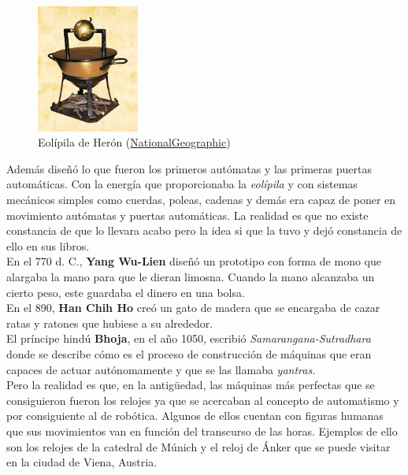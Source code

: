 \begin{figure}[H]
\begin{center}
  \includegraphics[width=0.3\textwidth]{./EtapaPrimeriza/imagenes/mv.jpg}
  \caption{Eolípila de Herón (\href{https://www.nationalgeographic.com.es/historia/grandes-reportajes/inventos-griegos\_9395}{NationalGeographic})}
  \label{mv}
\end{center}
\end{figure}

Además diseñó lo que fueron los primeros autómatas y las primeras puertas automáticas. Con la energía que proporcionaba la \textit{eolípila} y con sistemas mecánicos simples como cuerdas, poleas, cadenas y demás era capaz de poner en movimiento autómatas y puertas automáticas. La realidad es que no existe constancia de que lo llevara acabo pero la idea si que la tuvo y dejó constancia de ello en sus libros.\\


En el 770 d. C., \textbf{Yang Wu-Lien } diseñó un prototipo con forma de mono que alargaba la mano para que le dieran limosna. Cuando la mano alcanzaba un cierto peso, este guardaba el dinero en una bolsa.\\



En el 890, \textbf{Han Chih Ho} creó un gato de madera que se encargaba de cazar ratas y ratones que hubiese a su alrededor.\\

El príncipe hindú \textbf{Bhoja}, en el año 1050, escribió \textit{Samarangana-Sutradhara} donde se describe cómo es el proceso de construcción de máquinas que eran capaces de actuar autónomamente y que se las llamaba \textit{yantras}.\\


Pero la realidad es que, en la antigüedad, las máquinas más perfectas que se consiguieron fueron los relojes ya que se acercaban al concepto de automatismo y por consiguiente al de robótica. Algunos de ellos cuentan con figuras humanas que sus movimientos van en función del transcurso de las horas. Ejemplos de ello son los relojes de la catedral de Múnich y el reloj de Ánker que se puede visitar en la ciudad de Viena, Austria.

